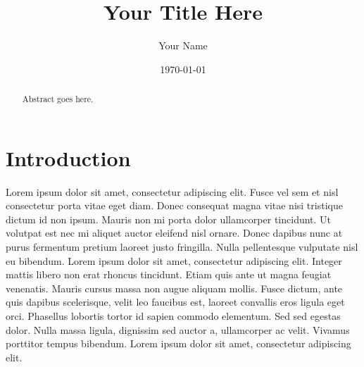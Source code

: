 \documentclass[english, oneside]{HYgradu}
\title{Your Title Here}
\author{Your Name}
\date{\today}
\begin{document}
\maketitle

\begin{abstract}
Abstract goes here.
\end{abstract}

\mytableofcontents




\chapter{Introduction}

Lorem ipsum dolor sit amet, consectetur adipiscing elit. Fusce vel sem et nisl consectetur porta vitae eget diam. Donec consequat magna vitae nisi tristique dictum id non ipsum. Mauris non mi porta dolor ullamcorper tincidunt. Ut volutpat est nec mi aliquet auctor eleifend nisl ornare. Donec dapibus nunc at purus fermentum pretium laoreet justo fringilla. Nulla pellentesque vulputate nisl eu bibendum. Lorem ipsum dolor sit amet, consectetur adipiscing elit. Integer mattis libero non erat rhoncus tincidunt. Etiam quis ante ut magna feugiat venenatis. Mauris cursus massa non augue aliquam mollis. Fusce dictum, ante quis dapibus scelerisque, velit leo faucibus est, laoreet convallis eros ligula eget orci. Phasellus lobortis tortor id sapien commodo elementum. Sed sed egestas dolor. Nulla massa ligula, dignissim sed auctor a, ullamcorper ac velit. Vivamus porttitor tempus bibendum. Lorem ipsum dolor sit amet, consectetur adipiscing elit.



%
%
\end{document}
